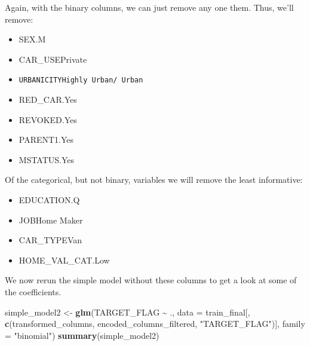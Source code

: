 \documentclass[
]{article}
\newenvironment{Shaded}{\begin{snugshade}}{\end{snugshade}}
\newcommand{\AttributeTok}[1]{\textcolor[rgb]{0.13,0.29,0.53}{#1}}
\newcommand{\FunctionTok}[1]{\textcolor[rgb]{0.13,0.29,0.53}{\textbf{#1}}}
\newcommand{\NormalTok}[1]{#1}
\newcommand{\OtherTok}[1]{\textcolor[rgb]{0.56,0.35,0.01}{#1}}
\newcommand{\SpecialCharTok}[1]{\textcolor[rgb]{0.81,0.36,0.00}{\textbf{#1}}}
\newcommand{\StringTok}[1]{\textcolor[rgb]{0.31,0.60,0.02}{#1}}
\providecommand{\tightlist}{%
  \setlength{\itemsep}{0pt}\setlength{\parskip}{0pt}}
\begin{document}
Again, with the binary columns, we can just remove any one them. Thus,
we'll remove:

\begin{itemize}
\tightlist
\item
  SEX.M
\item
  CAR\_USEPrivate
\item
  \texttt{URBANICITYHighly\ Urban/\ Urban}
\item
  RED\_CAR.Yes
\item
  REVOKED.Yes
\item
  PARENT1.Yes
\item
  MSTATUS.Yes
\end{itemize}

Of the categorical, but not binary, variables we will remove the least
informative:

\begin{itemize}
\tightlist
\item
  EDUCATION.Q
\item
  JOBHome Maker
\item
  CAR\_TYPEVan
\item
  HOME\_VAL\_CAT.Low
\end{itemize}

We now rerun the simple model without these columns to get a look at
some of the coefficients.

\begin{Shaded}
\begin{Highlighting}[]
\NormalTok{simple\_model2 }\OtherTok{\textless{}{-}} \FunctionTok{glm}\NormalTok{(TARGET\_FLAG }\SpecialCharTok{\textasciitilde{}}\NormalTok{ ., }\AttributeTok{data =}\NormalTok{ train\_final[, }\FunctionTok{c}\NormalTok{(transformed\_columns, encoded\_columns\_filtered, }\StringTok{"TARGET\_FLAG"}\NormalTok{)], }\AttributeTok{family =} \StringTok{"binomial"}\NormalTok{)}
\FunctionTok{summary}\NormalTok{(simple\_model2)}
\end{Highlighting}
\end{Shaded}
\end{document}
